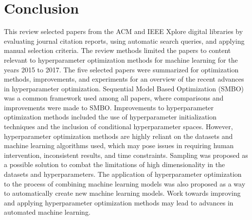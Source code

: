 

\section{Conclusion} \label{conclusion}

This review selected papers from the ACM and IEEE Xplore digital libraries by evaluating journal citation reports, using automatic search queries, and applying manual selection criteria. The review methods limited the papers to content relevant to hyperparameter optimization methods for machine learning for the years 2015 to 2017. The five selected papers were summarized for optimization methods, improvements, and experiments for an overview of the recent advances in hyperparameter optimization. Sequential Model Based Optimization (SMBO) was a common framework used among all papers, where comparisons and improvements were made to SMBO. Improvements to hyperparameter optimization methods included the use of hyperparameter initialization techniques and the inclusion of conditional hyperparameter spaces. However, hyperparameter optimization methods are highly reliant on the datasets and machine learning algorithms used, which may pose issues in requiring human intervention, inconsistent results, and time constraints. Sampling was proposed as a possible solution to combat the limitations of high dimensionality in the datasets and hyperparameters. The application of hyperparameter optimization to the process of combining machine learning models was also proposed as a way to automatically create new machine learning models. Work towards improving and applying hyperparameter optimization methods may lead to advances in automated machine learning.

